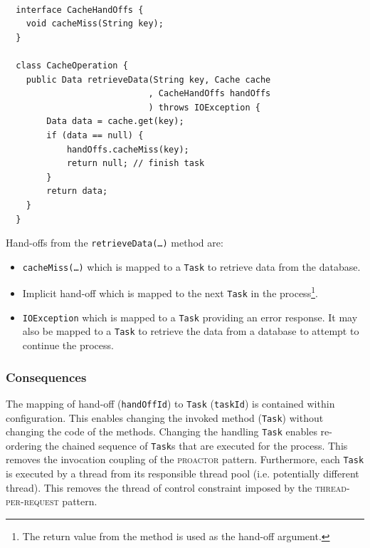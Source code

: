 \documentclass[prodmode]{style/acmlarge}
\begin{document}
\lstset{caption=Example developer code of a task for retrieving data from a cache\protect\footnotemark}
\begin{lstlisting}[float,label=lst:Example_Method_Task]

  interface CacheHandOffs {
    void cacheMiss(String key);
  }

  class CacheOperation {
    public Data retrieveData(String key, Cache cache
                            , CacheHandOffs handOffs
                            ) throws IOException {
        Data data = cache.get(key);
        if (data == null) {
            handOffs.cacheMiss(key);
            return null; // finish task
        }
        return data;
    }
  }
\end{lstlisting}

Hand-offs from the \texttt{retrieveData(\ldots)} method are:
\begin{itemize}
  \item \texttt{cacheMiss(\ldots)} which is mapped to a \texttt{Task} to retrieve data from the database.
  \item Implicit hand-off which is mapped to the next \texttt{Task} in the process\footnote{The return value from the method is used as the hand-off argument.}.
  \item \texttt{IOException} which is mapped to a \texttt{Task} providing an error response.  It may also be mapped to a \texttt{Task} to retrieve the data from a database to attempt to continue the process.
\end{itemize}


\subsubsection*{Consequences}

The mapping of hand-off (\texttt{handOffId}) to \texttt{Task} (\texttt{taskId})
is contained within configuration.  This enables changing the invoked method
(\texttt{Task}) without changing the code of the methods.  Changing the handling
\texttt{Task} enables re-ordering the chained sequence of \texttt{Task}s that
are executed for the process.  This removes the invocation coupling of the
\textsc{proactor} pattern.  Furthermore, each \texttt{Task} is executed by a
thread from its responsible thread pool (i.e. potentially different thread). 
This removes the thread of control constraint imposed by the
\textsc{thread-per-request} pattern.
\end{document}
